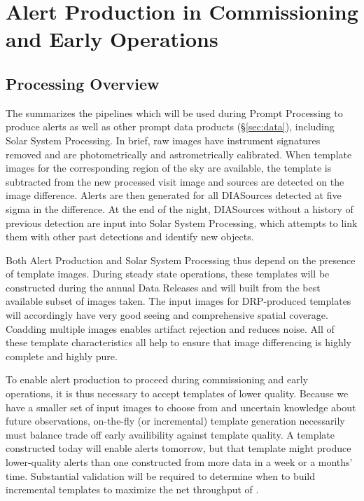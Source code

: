 \section{Alert Production in Commissioning and Early Operations}
\label{sec:pp}

\subsection{Processing Overview}

The \DPDD{} summarizes the pipelines which will be used during Prompt Processing to produce alerts as well as other prompt data products (\S \ref{sec:data}), including Solar System Processing.
In brief, raw images have instrument signatures removed and are photometrically and astrometrically calibrated.
When template images for the corresponding region of the sky are available, the template is subtracted from the new processed visit image and sources are detected on the image difference.
Alerts are then generated for all DIASources detected at five sigma in the difference.
At the end of the night, DIASources without a history of previous detection are input into Solar System Processing, which attempts to link them with other past detections and identify new objects.

Both Alert Production and Solar System Processing thus depend on the presence of template images.
During steady state operations, these templates will be constructed during the annual Data Releases and will built from the best available subset of images taken.
The input images for DRP-produced templates will accordingly have very good seeing and  comprehensive spatial coverage.
Coadding multiple images enables artifact rejection   and reduces noise.
All of these template characteristics all help to ensure that image differencing is highly complete and highly pure.

To enable alert production to proceed during commissioning and early operations, it is thus necessary to accept templates of lower quality.
Because we have a smaller set of input images to choose from and uncertain knowledge about future observations, on-the-fly (or incremental) template generation necessarily must balance trade off early availibility against template quality. 
A template constructed today will enable alerts tomorrow, but that template might produce lower-quality alerts than one constructed from more data in a week or a months' time.
Substantial validation will be required to determine when to build incremental templates to maximize the net throughput of \es.

